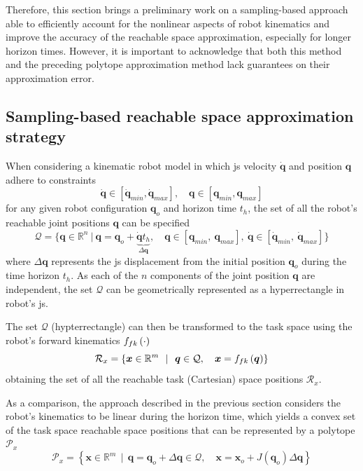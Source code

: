 Therefore, this section brings a preliminary work on a sampling-based approach able to efficiently account for the nonlinear aspects of robot kinematics and improve the accuracy of the reachable space approximation, especially for longer horizon times. However, it is important to acknowledge that both this method and the preceding polytope approximation method lack guarantees on their approximation error.

\subsection{Sampling-based reachable space approximation strategy}

When considering a kinematic robot model in which \gls{js} velocity $\dot{\bm{q}}$ and position $\bm{q}$ adhere to constraints
\begin{equation}
   \dot{\bm{q}} \in \left[\dot{\bm{q}}_{min},\dot{\bm{q}}_{max}\right], \quad 
   \bm{q} \in \left[{\bm{q}}_{min},{\bm{q}}_{max}\right]
\end{equation}
for any given robot configuration $\bm{q}_o$ and horizon time $t_h$, the set of all the robot's reachable joint positions $\bm{q}$ can be specified
\begin{equation}
\mathcal{Q}= \{ \bm{q}\in\mathbb{R}^n ~|~ \bm{q} = \bm{q}_o + \underbrace{\dot{\bm{q}}t_h}_{\Delta \bm{q}}, \quad \bm{q}\in[\bm{q}_{min}, ~ \bm{q}_{max}],~ \dot{\bm{q}}\in[\dot{\bm{q}}_{min}, ~ \dot{\bm{q}}_{max}] \}
\end{equation}
where $\Delta \bm{q}$ represents the \gls{js} displacement from the initial position $\bm{q}_o$ during the time horizon $t_h$. As each of the $n$ components of the joint position $\bm{q}$ are independent, the set $\mathcal{Q}$ can be geometrically represented as a hyperrectangle in robot's \gls{js}.

The set $\mathcal{Q}$ (hypterrectangle) can then be transformed to the task space using the robot's forward kinematics $f_{fk}\left(\cdot\right)$
\begin{equation}
    \mathcal{R}_x= \left\{ \bm{x} \in \mathbb{R}^m~~|~~ {\bm{q}} \in \mathcal{Q}, \quad
    \bm{x} =f_{fk}\left(\bm{q}\right)\right\}
\end{equation}
obtaining the set of all the reachable task (Cartesian) space positions $\mathcal{R}_x$.

As a comparison, the approach described in the previous section considers the robot's kinematics to be linear during the horizon time, which yields a convex set of the task space reachable space positions that can be represented by a polytope $\mathcal{P}_x$
\begin{equation}
    \mathcal{P}_x= \left\{ \bm{x} \in \mathbb{R}^m~~|~~ \bm{q} = \bm{q}_o + \Delta \bm{q} \in {\mathcal{Q}}, \quad 
    \bm{x} = \bm{x}_o + J(\bm{q}_o)\Delta \bm{q}\right\}
\end{equation}


